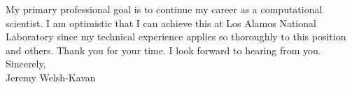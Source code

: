 \documentclass[]{letter}
\begin{document}
My primary professional goal is to continue my career as a computational scientist. I am optimistic that I can achieve this at Los Alamos National Laboratory since my technical experience applies so thoroughly to this position and others. Thank you for your time. I look forward to hearing from you. \\

Sincerely, \\
Jeremy Welsh-Kavan
\end{document}
